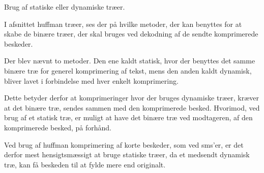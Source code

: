 Brug af statiske eller dynamiske træer.

I afsnittet huffman træer, ses der på hvilke metoder, der kan benyttes for at skabe de binære træer, der skal bruges ved dekodning af de sendte komprimerede beskeder.

Der blev nævnt to metoder. Den ene kaldt statisk, hvor der benyttes det samme binære træ for generel komprimering af tekst, mens den anden kaldt dynamisk, bliver lavet i forbindelse med hver enkelt komprimering.

Dette betyder derfor at komprimeringer hvor der bruges dynamiske træer, kræver at det binære træ, sendes sammen med den komprimerede besked. Hvorimod, ved brug af et statisk træ, er muligt at have det binære træ ved modtageren, af den komprimerede besked, på forhånd.

Ved brug af huffman komprimering af korte beskeder, som ved sms’er, er det derfor mest hensigtsmæssigt at bruge statiske træer, da et medsendt dynamisk træ, kan få beskeden til at fylde mere end originalt.